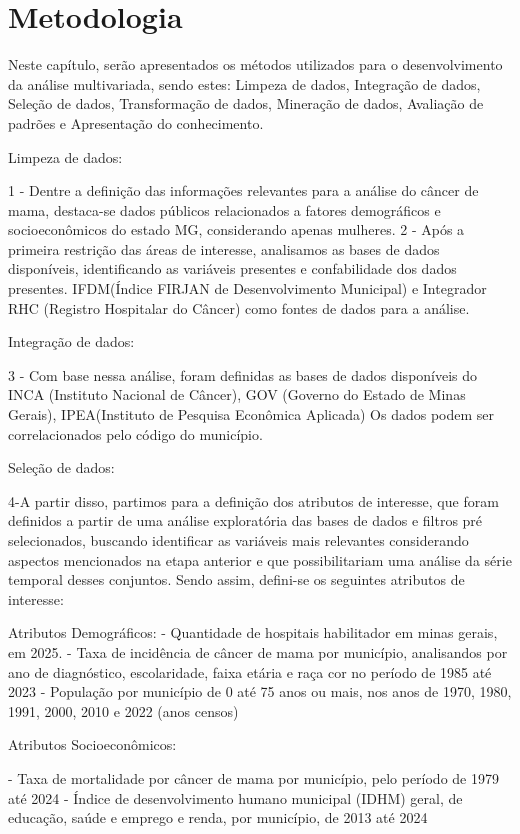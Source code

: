 \chapter{Metodologia}

Neste capítulo, serão apresentados os métodos utilizados para o desenvolvimento da análise multivariada, sendo estes: Limpeza de dados, Integração de dados, Seleção de dados, Transformação de dados, Mineração de dados, Avaliação de padrões e Apresentação do conhecimento.


Limpeza de dados:

1 - Dentre a definição das informações relevantes para a análise do câncer de mama, destaca-se dados públicos relacionados a fatores demográficos e socioeconômicos do estado MG, considerando apenas mulheres.
2 - Após a primeira restrição das áreas de interesse, analisamos as bases de dados disponíveis, identificando as variáveis presentes e confabilidade dos dados presentes. 
IFDM(Índice FIRJAN de Desenvolvimento Municipal) e Integrador RHC (Registro Hospitalar do Câncer) como fontes de dados para a análise.

Integração de dados:

3 - Com base nessa análise, foram definidas as bases de dados disponíveis do INCA (Instituto Nacional de Câncer), GOV (Governo do Estado de Minas Gerais), IPEA(Instituto de Pesquisa Econômica Aplicada)
Os dados podem ser correlacionados pelo código do município.

Seleção de dados:

4-A partir disso, partimos para a definição dos atributos de interesse, que foram definidos a partir de uma análise exploratória das bases de dados e filtros pré selecionados, buscando identificar 
as variáveis mais relevantes considerando aspectos mencionados na etapa anterior e que possibilitariam uma análise da série temporal desses conjuntos.
Sendo assim, defini-se os seguintes atributos de interesse:

    Atributos Demográficos:
    - Quantidade de hospitais habilitador em minas gerais, em 2025. 
    - Taxa de incidência de câncer de mama por município, analisandos por ano de diagnóstico, escolaridade, faixa etária e raça cor no período de 1985 até 2023
    - População por município de 0 até 75 anos ou mais, nos anos de 1970, 1980, 1991, 2000, 2010 e 2022 (anos censos)

    Atributos Socioeconômicos:

    - Taxa de mortalidade por câncer de mama por município, pelo período de 1979 até 2024
    - Índice de desenvolvimento humano municipal (IDHM) geral, de educação, saúde e emprego e renda, por município, de 2013 até 2024

